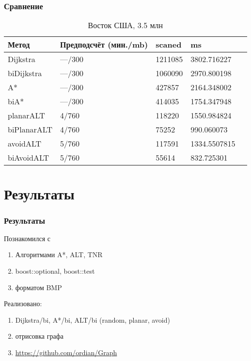 \documentclass{beamer}
\begin{document}

\begin{frame}
\frametitle{Сравнение}
\begin{table}
\begin{tabular}{l l l l l}
\toprule
\textbf{Метод} & \textbf{Предподсчёт (мин./mb)} & \textbf{scaned} 
& \textbf{ms}\\
\midrule
Dijkstra    & ---/300  & 1211085 & 3802.716227\\
biDijkstra  & ---/300  & 1060090 & 2970.800198\\
A*          & ---/300  &  427857 & 2164.348002\\
biA*        & ---/300  &  414035 & 1754.347948\\
planarALT   &   4/760  & 118220 & 1550.984824\\
biPlanarALT &   4/760  &  75252 &  990.060073\\
avoidALT    &   5/760  & 117591 & 1334.5507815\\
biAvoidALT  &   5/760  &  55614 &  832.725301\\
\bottomrule
\end{tabular}
\caption{Восток США, 3.5 млн}
\end{table}
\end{frame}



\section{Результаты}

\begin{frame}
\frametitle{Результаты}
Познакомился с 
\begin{enumerate}
\item Алгоритмами A*, ALT, TNR
\item boost::optional, boost::test
\item форматом BMP 
\end{enumerate}
Реализовано:
\begin{enumerate}
\item Dijkstra/bi, A*/bi, ALT/bi (random, planar, avoid)
\item отрисовка графа
\item \url{https://github.com/ordian/Graph}
\end{enumerate}
\end{frame}
\end{document}

